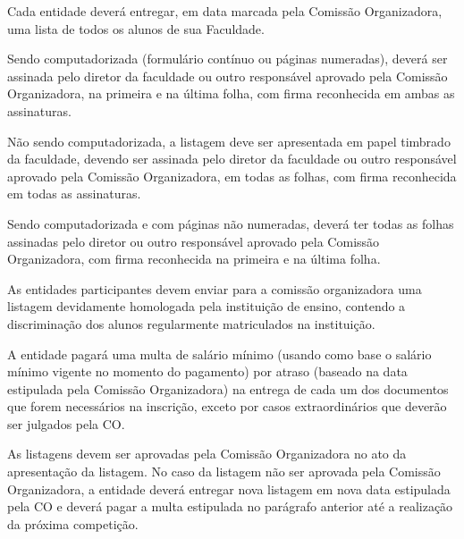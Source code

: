 \begin{article}
	Cada entidade deverá entregar, em data marcada pela Comissão Organizadora, uma lista de todos os alunos de sua Faculdade.

	\begin{xparagraph}
		Sendo computadorizada (formulário contínuo ou páginas numeradas), deverá ser assinada pelo diretor da faculdade ou outro responsável aprovado pela Comissão Organizadora, na primeira e na última folha, com firma reconhecida em ambas as assinaturas.
	\end{xparagraph}

	\begin{xparagraph}
		Não sendo computadorizada, a listagem deve ser apresentada em papel timbrado da faculdade, devendo ser assinada pelo diretor da faculdade ou outro responsável aprovado pela Comissão Organizadora, em todas as folhas, com firma reconhecida em todas as assinaturas.
	\end{xparagraph}

	\begin{xparagraph}
		Sendo computadorizada e com páginas não numeradas, deverá ter todas as folhas assinadas pelo diretor ou outro responsável aprovado pela Comissão Organizadora, com firma reconhecida na primeira e na última folha.
	\end{xparagraph}

	\begin{xparagraph}
		As entidades participantes devem enviar para a comissão organizadora uma listagem devidamente homologada pela instituição de ensino, contendo a discriminação dos alunos regularmente matriculados na instituição.
	\end{xparagraph}

	\begin{xparagraph}
		A entidade pagará uma multa de  salário mínimo (usando como base o salário mínimo vigente no momento do pagamento) por atraso (baseado na data estipulada pela Comissão Organizadora) na entrega de cada um dos documentos que forem necessários na inscrição, exceto por casos extraordinários que deverão ser julgados pela CO.
	\end{xparagraph}

	\begin{xparagraph}
		As listagens devem ser aprovadas pela Comissão Organizadora no ato da apresentação da listagem. No caso da listagem não ser aprovada pela Comissão Organizadora, a entidade deverá entregar nova listagem em nova data estipulada pela CO e deverá pagar a multa estipulada no parágrafo anterior até a realização da próxima competição.
	\end{xparagraph}
\end{article}

